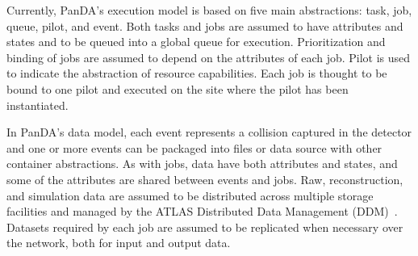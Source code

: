Currently, PanDA's execution model is based on five main abstractions: task,
job, queue, pilot, and event. Both tasks and jobs are assumed to have attributes
and states and to be queued into a global queue for execution. Prioritization
and binding of jobs are assumed to depend on the attributes of each job. Pilot
is used to indicate the abstraction of resource capabilities. Each job is
thought to be bound to one pilot and executed on the site where the pilot has
been instantiated.


In PanDA's data model, each event represents a collision captured in the
detector and one or more events can be packaged into files or data source with
other container abstractions. As with jobs, data have both attributes and
states, and some of the attributes are shared between events and jobs.
Raw, reconstruction, and simulation data are assumed to be distributed across
multiple storage facilities and managed by the ATLAS Distributed Data Management
(DDM)~\cite{garonne2012atlas}. Datasets required by each job are assumed to be
replicated when necessary over the network, both for input and output data.


